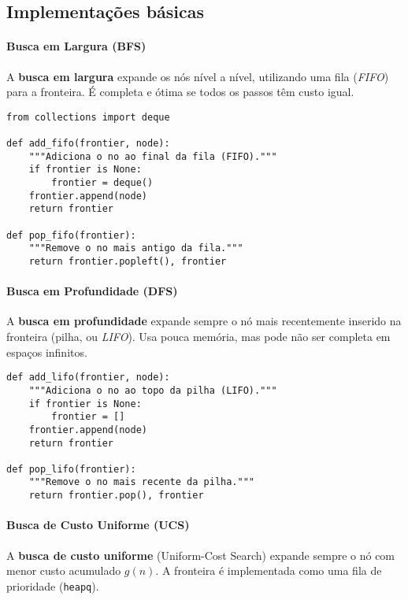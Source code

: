 \documentclass[9pt,a4paper]{extarticle}
\begin{document}
\subsection{Implementações básicas}
\paragraph{Busca em Largura (BFS)}
A \textbf{busca em largura} expande os nós nível a nível, utilizando uma fila (\textit{FIFO}) para a fronteira.  
É completa e ótima se todos os passos têm custo igual.

\begin{lstlisting}
from collections import deque

def add_fifo(frontier, node):
    """Adiciona o no ao final da fila (FIFO)."""
    if frontier is None:
        frontier = deque()
    frontier.append(node)
    return frontier

def pop_fifo(frontier):
    """Remove o no mais antigo da fila."""
    return frontier.popleft(), frontier
\end{lstlisting}

\paragraph{Busca em Profundidade (DFS)}
A \textbf{busca em profundidade} expande sempre o nó mais recentemente inserido na fronteira (pilha, ou \textit{LIFO}).  
Usa pouca memória, mas pode não ser completa em espaços infinitos.

\begin{lstlisting}
def add_lifo(frontier, node):
    """Adiciona o no ao topo da pilha (LIFO)."""
    if frontier is None:
        frontier = []
    frontier.append(node)
    return frontier

def pop_lifo(frontier):
    """Remove o no mais recente da pilha."""
    return frontier.pop(), frontier
\end{lstlisting}

\paragraph{Busca de Custo Uniforme (UCS)}
A \textbf{busca de custo uniforme} (Uniform-Cost Search) expande sempre o nó com menor custo acumulado $g(n)$.  
A fronteira é implementada como uma fila de prioridade (\texttt{heapq}).
\end{document}
